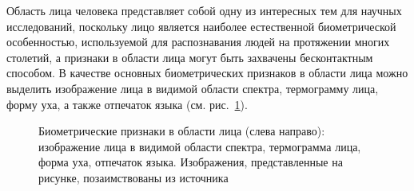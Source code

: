 \documentclass[12pt]{book}
\begin{document}
\large{Область лица человека представляет собой одну из интересных тем для научных исследований, поскольку лицо является наиболее естественной биометрической особенностью, используемой для распознавания людей на протяжении многих столетий, а признаки в области лица могут быть захвачены бесконтактным способом. В качестве основных биометрических признаков в области лица можно выделить изображение лица в видимой области спектра, термограмму лица, форму уха, а также отпечаток языка (см. рис.~\ref{fig:figure_1_3}).}

\begin{figure}[h]
\caption{Биометрические признаки в области лица (слева направо): изображение лица в видимой области спектра, термограмма лица, форма уха, отпечаток языка. Изображения, представленные на рисунке, позаимствованы из источника \cite{unar_2014}}
\label{fig:figure_1_3}
\end{figure}
\end{document}
